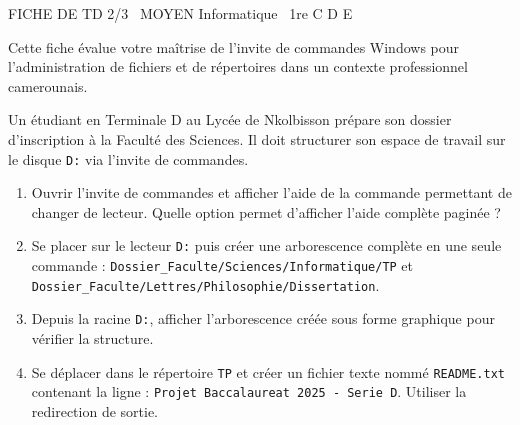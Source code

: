 \documentclass[11pt]{article}
\begin{document}
\begin{tcolorbox}[enhanced,colback=popink,colframe=popink,arc=10pt,boxrule=0pt,left=12pt,right=12pt,top=9pt,bottom=9pt]
{\color{white}\popxbold\small FICHE DE TD 2/3 \textbullet\ MOYEN \hfill Informatique \textbullet\ 1re C D E\par}
\end{tcolorbox}
\vspace{4pt}
Cette fiche évalue votre maîtrise de l'invite de commandes Windows pour l'administration de fichiers et de répertoires dans un contexte professionnel camerounais.

\begin{exercice}
Un étudiant en Terminale D au Lycée de Nkolbisson prépare son dossier d'inscription à la Faculté des Sciences. Il doit structurer son espace de travail sur le disque \texttt{D:} via l'invite de commandes.
\begin{enumerate}
    \item Ouvrir l'invite de commandes et afficher l'aide de la commande permettant de changer de lecteur. Quelle option permet d'afficher l'aide complète paginée ?
    \item Se placer sur le lecteur \texttt{D:} puis créer une arborescence complète en une seule commande : \texttt{Dossier\_Faculte/Sciences/Informatique/TP} et \texttt{Dossier\_Faculte/Lettres/Philosophie/Dissertation}.
    \item Depuis la racine \texttt{D:}, afficher l'arborescence créée sous forme graphique pour vérifier la structure.
    \item Se déplacer dans le répertoire \texttt{TP} et créer un fichier texte nommé \texttt{README.txt} contenant la ligne : \texttt{Projet Baccalaureat 2025 - Serie D}. Utiliser la redirection de sortie.
\end{enumerate}
\end{exercice}
\end{document}
